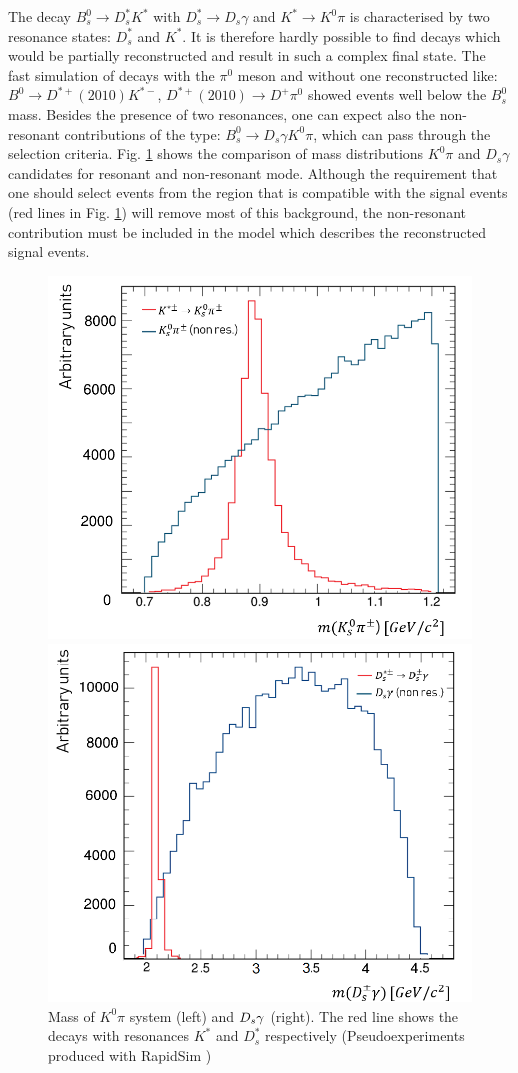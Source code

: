 \documentclass{appolb}
\begin{document}
The decay $B^0_s \rightarrow D_s^* K^*$ with $D_s^*\rightarrow D_s \gamma$ and $K^*\rightarrow K^0 \pi$ is characterised by two resonance states: $D_s^*$ and $K^*$. It is therefore hardly possible to find  decays which would be partially reconstructed and result in such a complex final state. The fast simulation of decays with the $\pi^0$ meson and without one \g reconstructed like: $B^0 \rightarrow D^{*+}(2010) K^{*-}$, $D^{*+}(2010)\rightarrow D^+ \pi^0$ showed events well below the $B^0_s$ mass. Besides the presence of two resonances, one can expect also the non-resonant contributions of the type: $B^0_s \rightarrow D_s \gamma  K^0 \pi$,  which can pass through the selection criteria.  Fig. \ref{Fig:F2} shows the comparison of mass distributions $K^0 \pi$ and $D_s \gamma$ candidates for resonant and non-resonant mode. Although the requirement that one should select events from the region that is compatible with the signal events (red lines in Fig. \ref{Fig:F2}) will remove most of this background, the non-resonant contribution must be included in the model which describes the reconstructed signal events.
\begin{figure}[htbp]
\centering
\begin{minipage}{0.5\textwidth}
  \centering
\includegraphics[width=6.4 cm]{Kstar.png}
\end{minipage}%
\begin{minipage}{0.5\textwidth}
  \centering
\includegraphics[width= 6.4 cm]{Dstar.png}
\end{minipage}%
\caption{Mass  of $K^0 \pi$ system (left) and $D_s {\gamma}$ (right).
The red line shows the decays with resonances $K^*$ and $D_s^*$ respectively (Pseudoexperiments produced with RapidSim \cite{rapidsim})} 
\label{Fig:F2}
\end{figure}
\end{document}
